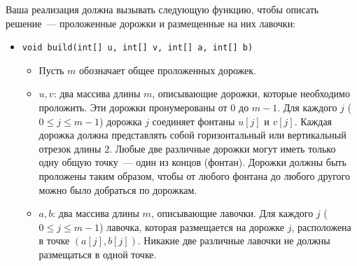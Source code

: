 Ваша реализация должна вызывать следующую функцию, чтобы описать решение~--- проложенные дорожки и размещенные на них лавочки:

\begin{itemize}

\item \texttt{void build(int[] u, int[] v, int[] a, int[] b)}
\begin{itemize}

\item Пусть $m$ обозначает общее проложенных дорожек.
\item $u,v$: два массива длины $m$, описывающие дорожки, которые необходимо проложить. Эти дорожки пронумерованы от $0$ до $m-1$. Для каждого $j$ ($0 \leq j \leq m-1$) дорожка $j$ соединяет фонтаны $u[j]$ и $v[j]$. Каждая дорожка должна представлять собой горизонтальный или вертикальный отрезок длины $2$. Любые две различные дорожки могут иметь только одну общую точку~--- один из концов (фонтан). Дорожки должны быть проложены таким образом, чтобы от любого фонтана до любого другого можно было добраться по дорожкам.
\item $a,b$: два массива длины $m$, описывающие лавочки. Для каждого $j$ ($0 \leq j \leq m-1$) лавочка, которая размещается на дорожке $j$, расположена в точке $(a[j],b[j])$. Никакие две различные лавочки не должны размещаться в одной точке.
\end{itemize}
\end{itemize}